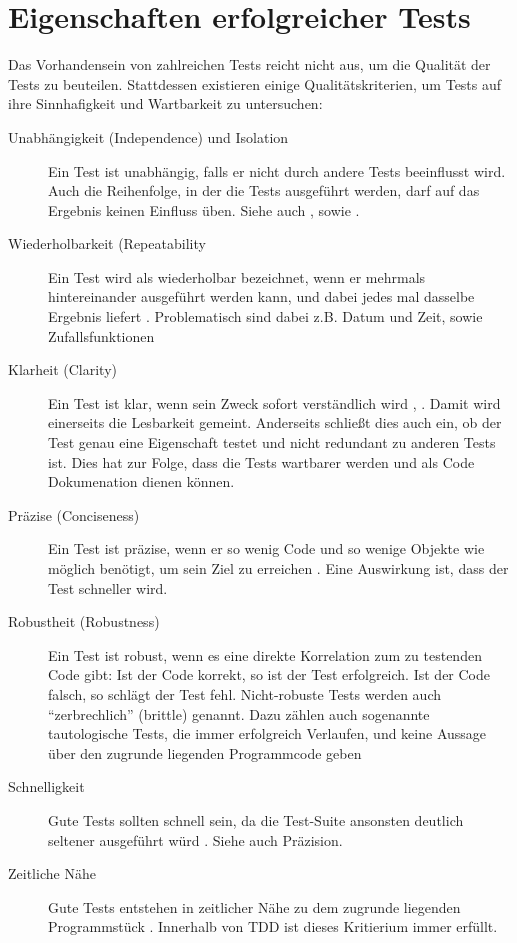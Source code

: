 \appendix

\chapter{Eigenschaften erfolgreicher Tests}

Das Vorhandensein von zahlreichen Tests reicht nicht aus, um die Qualität der Tests zu beuteilen. Stattdessen existieren einige Qualitätskriterien, um Tests auf ihre Sinnhafigkeit und Wartbarkeit zu untersuchen:

\begin{description}
 \item[Unabhängigkeit (Independence) und Isolation] Ein Test ist unabhängig, falls er nicht durch andere Tests beeinflusst wird. Auch die Reihenfolge, in der die Tests ausgeführt werden, darf auf das Ergebnis keinen Einfluss üben. Siehe auch \citep{beck_test_2002}, \citep{palermo_guidelines_2006} sowie \citep[Karte 45]{langr_agile_2011}.
 \item[Wiederholbarkeit (Repeatability] Ein Test wird als wiederholbar bezeichnet, wenn er mehrmals hintereinander ausgeführt werden kann, und dabei jedes mal dasselbe Ergebnis liefert \citep[Karte 45]{langr_agile_2011} \citep{rappin_rails_2011}. Problematisch sind dabei z.B. Datum und Zeit, sowie Zufallsfunktionen
 \item[Klarheit (Clarity)] Ein Test ist klar, wenn sein Zweck sofort verständlich wird \citep{rappin_rails_2011}, \citep{palermo_guidelines_2006}. Damit wird einerseits die Lesbarkeit gemeint. Anderseits schließt dies auch ein, ob der Test genau eine Eigenschaft testet und nicht redundant zu anderen Tests ist. Dies hat zur Folge, dass die Tests wartbarer werden und als Code Dokumenation dienen können.
 \item[Präzise (Conciseness)] Ein Test ist präzise, wenn er so wenig Code und so wenige Objekte wie möglich benötigt, um sein Ziel zu erreichen \citep{palermo_guidelines_2006} \citep{rappin_rails_2011}. Eine Auswirkung ist, dass der Test schneller wird.
 \item[Robustheit (Robustness)] Ein Test ist robust, wenn es eine direkte Korrelation zum zu testenden Code gibt: Ist der Code korrekt, so ist der Test erfolgreich. Ist der Code falsch, so schlägt der Test fehl. Nicht-robuste Tests werden auch "`zerbrechlich"' (brittle) genannt. Dazu zählen auch sogenannte tautologische Tests, die immer erfolgreich Verlaufen, und keine Aussage über den zugrunde liegenden Programmcode geben
 \item[Schnelligkeit] Gute Tests sollten schnell sein, da die Test-Suite ansonsten deutlich seltener ausgeführt würd \citep{langr_agile_2011} \citep{palermo_guidelines_2006} \citep{nagappan_realizing_2008}. Siehe auch Präzision.
 \item[Zeitliche Nähe] Gute Tests entstehen in zeitlicher Nähe zu dem zugrunde liegenden Programmstück \citep{langr_agile_2011}. Innerhalb von TDD ist dieses Kritierium immer erfüllt.
 \end{description}

